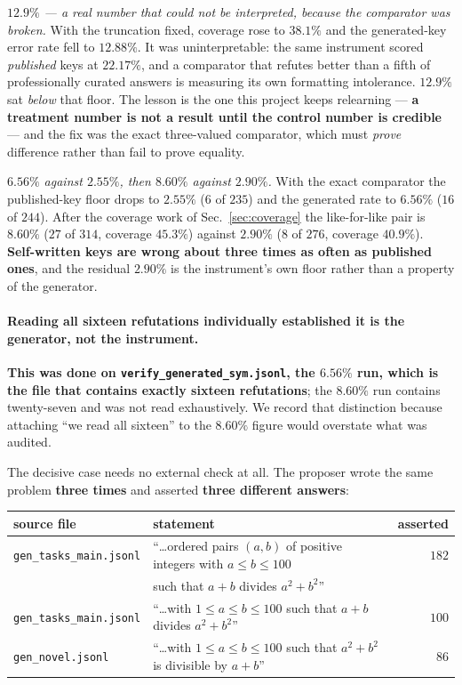 \emph{$12.9\%$ --- a real number that could not be interpreted, because the comparator was
broken.} With the truncation fixed, coverage rose to $38.1\%$ and the generated-key error rate
fell to $12.88\%$. It was uninterpretable: the same instrument scored \emph{published} keys at
$22.17\%$, and a comparator that refutes better than a fifth of professionally curated answers
is measuring its own formatting intolerance. $12.9\%$ sat \emph{below} that floor. The lesson
is the one this project keeps relearning --- \textbf{a treatment number is not a result until
the control number is credible} --- and the fix was the exact three-valued comparator, which
must \emph{prove} difference rather than fail to prove equality.

\emph{$6.56\%$ against $2.55\%$, then $8.60\%$ against $2.90\%$.} With the exact comparator the
published-key floor drops to $2.55\%$ ($6$ of $235$) and the generated rate to $6.56\%$ ($16$ of
$244$). After the coverage work of Sec.~\ref{sec:coverage} the like-for-like pair is
$\mathbf{8.60\%}$ ($27$ of $314$, coverage $45.3\%$) against $\mathbf{2.90\%}$ ($8$ of $276$,
coverage $40.9\%$). \textbf{Self-written keys are wrong about three times as often as published
ones}, and the residual $2.90\%$ is the instrument's own floor rather than a property of the
generator.

\paragraph{Reading all sixteen refutations individually established it is the generator, not
the instrument.} \textbf{This was done on \texttt{verify\_generated\_sym.jsonl}, the $6.56\%$
run, which is the file that contains exactly sixteen refutations}; the $8.60\%$ run contains
twenty-seven and was not read exhaustively. We record that distinction because attaching
``we read all sixteen'' to the $8.60\%$ figure would overstate what was audited.

The decisive case needs no external check at all. The proposer wrote the same problem
\textbf{three times} and asserted \textbf{three different answers}:

\begin{center}\small
\begin{tabular}{llr}
\toprule
source file & statement & asserted \\
\midrule
\texttt{gen\_tasks\_main.jsonl} & ``\ldots ordered pairs $(a,b)$ of positive integers with $a \le b \le 100$ & $182$ \\
                                & \quad such that $a+b$ divides $a^2+b^2$'' & \\
\texttt{gen\_tasks\_main.jsonl} & ``\ldots with $1 \le a \le b \le 100$ such that $a+b$ divides $a^2+b^2$'' & $100$ \\
\texttt{gen\_novel.jsonl}       & ``\ldots with $1 \le a \le b \le 100$ such that $a^2+b^2$ is divisible by $a+b$'' & $86$ \\
\bottomrule
\end{tabular}
\end{center}

